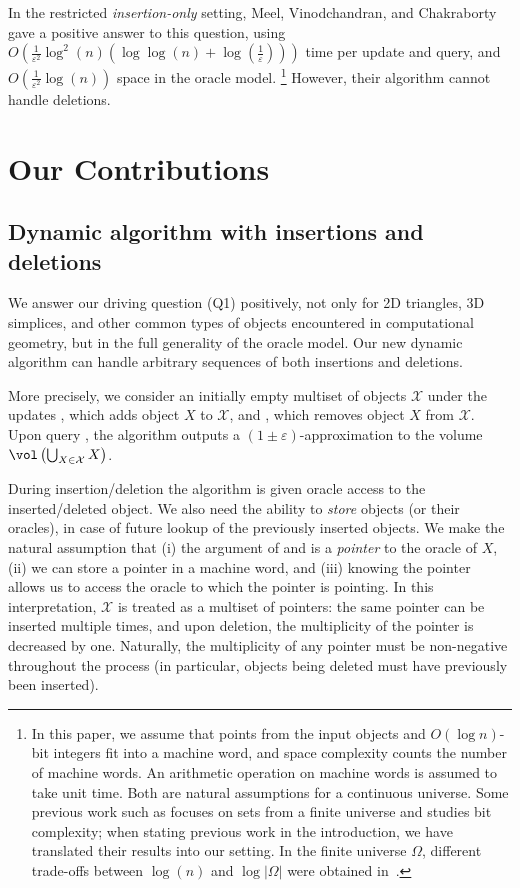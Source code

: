 \documentclass[a4paper, 11pt]{article}
\newcommand{\eps}{\varepsilon}
\newcommand{\class}[1]{\mathcal{#1}}
\begin{document}
In the restricted \emph{insertion-only} setting, Meel, Vinodchandran, and Chakraborty~\cite{MVC21} gave a positive answer to this question, using $O\left(\frac{1}{\eps^2} \log^2(n) (\log \log(n) + \log(\frac{1}{\eps})) \right)$ time per update and query, and $O\left( \frac{1}{\eps^2} \log(n) \right)$ space in the oracle model.%
\footnote{In this paper, we assume that points from the input objects and $O(\log n)$-bit integers fit into a machine word, and space complexity counts the number of machine words. An arithmetic operation on machine words is assumed to take unit time. Both are natural assumptions for a continuous universe. Some previous work such as \cite{MVC21} focuses on sets from a finite universe and studies bit complexity; when stating previous work in the introduction, we have translated their results into our setting. In the finite universe $\Omega$, different trade-offs between $\log(n)$ and $\log |\Omega|$ were obtained in~\cite{MCV22,NandiVGMP024}.}
However, their algorithm cannot handle deletions.

\section{Our Contributions}

\subsection{Dynamic algorithm with insertions and deletions}
We answer our driving question (Q1) positively, not only for 2D triangles, 3D simplices, and other common types of objects encountered in computational geometry, but in the full generality of the oracle model.  Our new dynamic algorithm can handle arbitrary sequences of both insertions and deletions.

More precisely, we consider an initially empty multiset of objects $\class{X}$ under the updates , which adds object $X$ to $\class{X}$, and , which removes object $X$ from $\class{X}$. Upon query \est{}, the algorithm outputs a $(1\pm\eps)$-approximation to the volume $\vol\left(\bigcup_{X \in \class{X}} X\right)$.

During insertion/deletion the algorithm is given oracle access to the inserted/deleted object. We also need the ability to \emph{store} objects (or their oracles), in case of future lookup of the previously inserted objects. We make the natural assumption that (i) the argument of  and  is a \emph{pointer} to the oracle of $X$, (ii) we can store a pointer in a machine word, and (iii) knowing the pointer allows us to access the oracle to which the pointer is pointing. In this interpretation, $\class{X}$ is treated as a multiset of pointers: the same pointer can be inserted multiple times, and upon deletion, the multiplicity of the pointer is decreased by one. Naturally, the multiplicity of any pointer must be non-negative throughout the process (in particular, objects being deleted must have previously been inserted).
\end{document}
